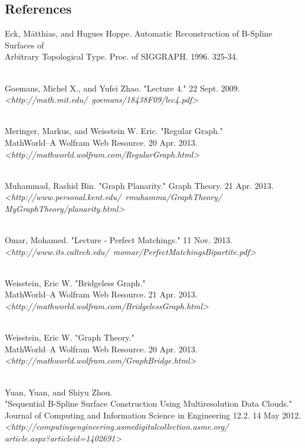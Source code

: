 \documentclass[12pt]{article}
\begin{document}
\begin{flushleft}
\newpage
\section*{References}
\begin{tabbing}
Eck, M\=atthias, and Hugues Hoppe. Automatic Reconstruction of B-Spline Surfaces of \\ \> Arbitrary Topological Type. Proc. of SIGGRAPH. 1996. 325-34.

\\Goemans, Michel X., and Yufei Zhao. "Lecture 4." 22 Sept. 2009.
\\ \> \emph{\textless http://math.mit.edu/~goemans/18438F09/lec4.pdf\textgreater}

\\Meringer, Markus, and Weisstein W. Eric. "Regular Graph."
\\ \> MathWorld--A Wolfram Web Resource. 20 Apr. 2013.
\\ \> \emph{\textless http://mathworld.wolfram.com/RegularGraph.html\textgreater}

\\Muhammad, Rashid Bin. "Graph Planarity." Graph Theory. 21 Apr. 2013.
\\ \> \emph{\textless http://www.personal.kent.edu/~rmuhamma/GraphTheory/}
\\ \> \emph{MyGraphTheory/planarity.html\textgreater}

\\Omar, Mohamed. "Lecture - Perfect Matchings." 11 Nov. 2013.
\\ \> \emph{\textless http://www.its.caltech.edu/~momar/PerfectMatchingsBipartite.pdf\textgreater}

\\Weisstein, Eric W. "Bridgeless Graph."
\\ \> MathWorld--A Wolfram Web Resource. 21 Apr. 2013.
\\ \> \emph{\textless  http://mathworld.wolfram.com/BridgelessGraph.html\textgreater}

\\Weisstein, Eric W. "Graph Theory."
\\ \> MathWorld--A Wolfram Web Resource. 20 Apr. 2013.
\\ \> \emph{\textless http://mathworld.wolfram.com/GraphBridge.html\textgreater}

\\Yuan, Yuan, and Shiyu Zhou.
\\ \>"Sequential B-Spline Surface Construction Using Multiresolution Data Clouds."
\\ \>Journal of Computing and Information Science in Engineering 12.2. 14 May 2012.
\\ \> \emph{\textless http://computingengineering.asmedigitalcollection.asme.org/}
\\ \> \emph{article.aspx?articleid=1402691\textgreater}


\end{tabbing}

\end{flushleft}
\end{document}
